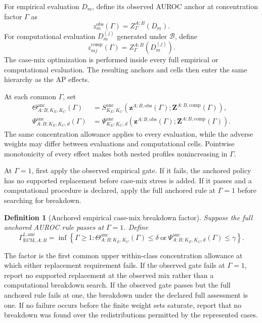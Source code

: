 \documentclass[11pt]{article}
\newcommand{\Boot}{\mathcal{B}}
\newcommand{\Sanc}{S^{\mathrm{anc}}}
\newcommand{\Psianc}{\Psi^{\mathrm{anc}}}
\newcommand{\Thetaanc}{\Theta^{\mathrm{anc}}}
\newtheorem{definition}{Definition}
\theoremstyle{remark}
\begin{document}
For empirical evaluation $D_m$, define its observed AUROC anchor at
concentration factor $\Gamma$ as
\[
z_m^{\mathrm{obs}}(\Gamma)
=Z_\Gamma^{A:B}(D_m).
\]
For computational evaluation $D_m^{(j)}$ generated under $\Boot$, define
\[
z_{mj}^{\mathrm{comp}}(\Gamma)
=Z_\Gamma^{A:B}(D_m^{(j)}).
\]
The case-mix optimization is performed inside every full empirical or
computational evaluation. The resulting anchors and cells then enter the same
hierarchy as the AP effects.

At each common $\Gamma$, set
\begin{align}
\Thetaanc_{A:B;K_E,K_C}(\Gamma)
&=
\Sanc_{K_E;K_C}
\left(
\mathbf z^{A:B,\mathrm{obs}}(\Gamma);
\mathbf Z^{A:B,\mathrm{comp}}(\Gamma)
\right),
\label{eq:auroc-anchored-magnitude}\\
\Psianc_{A:B;K_E,K_C,d}(\Gamma)
&=
\Psianc_{K_E;K_C,d}
\left(
\mathbf z^{A:B,\mathrm{obs}}(\Gamma);
\mathbf Z^{A:B,\mathrm{comp}}(\Gamma)
\right).
\label{eq:auroc-anchored-survival}
\end{align}
The same concentration allowance applies to every evaluation, while the
adverse weights may differ between evaluations and computational cells.
Pointwise monotonicity of every effect makes both nested profiles nonincreasing
in $\Gamma$.

At $\Gamma=1$, first apply the observed empirical gate. If it fails, the
anchored policy has no supported replacement before case-mix stress is added.
If it passes and a computational procedure is declared, apply the full
anchored rule at $\Gamma=1$ before searching for breakdown.

\begin{definition}[Anchored empirical case-mix breakdown factor]
Suppose the full anchored AUROC rule passes at $\Gamma=1$. Define
\begin{equation}
\Gamma_{\mathrm{ECM},A:B}^{\dagger,\mathrm{anc}}
=
\inf\left\{\Gamma\geq1:
\Thetaanc_{A:B;K_E,K_C}(\Gamma)\leq\delta
\ \text{or}\ 
\Psianc_{A:B;K_E,K_C,d}(\Gamma)\leq\gamma
\right\}.
\label{eq:anchored-breakdown}
\end{equation}
\end{definition}

The factor is the first common upper within-class concentration allowance at
which either replacement requirement fails. If the observed gate fails at
$\Gamma=1$, report no supported replacement at the observed mix rather than a
computational breakdown search. If the observed gate passes but the full
anchored rule fails at one, the breakdown under the declared full assessment
is one. If no failure occurs before the finite weight sets saturate, report that
no breakdown was found over the redistributions permitted by the represented
cases.
\end{document}
